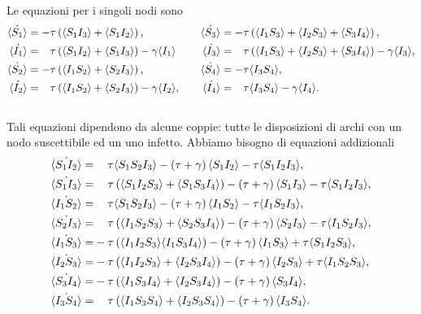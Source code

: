 \documentclass{report}
\begin{document}
Le equazioni per i singoli nodi sono 
 \begin{equation*}
 \begin{aligned}
 \dot{\angol{S_1}}&= -\tau \tonde{ \angol{ S_1 I_3} + \angol{S_1 I_2}},  \quad 
 &\dot{\angol{S_3}}&= -\tau \tonde{ \angol{I_1 S_3} + \angol{I_2 S_3}+ \angol{S_3 I_4}},  \\
 \dot{\angol{I_1}}&= \spa \tau \tonde{ \angol{ S_1 I_2} + \angol{S_1 I_3}} - \gamma\angol{I_1} \quad 
 &\dot{\angol{I_3}}&= \spa \tau \tonde{ \angol{I_1 S_3} + \angol{I_2 S_3}+ \angol{S_3 I_4}}-\gamma\angol{I_3},\\
 \dot{\angol{S_2}}&= -\tau \tonde{ \angol{ I_1 S_2} + \angol{S_2 I_3}}, \quad &\dot{\angol{S_4}} &= -\tau \angol{I_3S_4},  \\
 \dot{\angol{I_2}}&= \spa \tau \tonde{ \angol{ I_1 S_2} + \angol{S_2 I_3}} - \gamma\angol{I_2},\quad & \dot{\angol{I_4}}&=\spa \tau\angol{I_3S_4}-\gamma\angol{I_4}. \\\
 \end{aligned}	
 \end{equation*}
 Tali equazioni dipendono da alcune coppie: tutte le disposizioni di archi con un nodo suscettibile ed un uno infetto. Abbiamo bisogno di equazioni addizionali
 \begin{equation*}
 \begin{aligned}
 \dot{\angol{S_1I_2}} =&\spa \tau\angol{S_1S_2I_3} - \tonde{ \tau + \gamma} \angol{S_1 I_2} -\tau\angol{S_1I_2I_3},\\
 \dot{\angol{S_1I_3}}=&\spa \tau\tonde{ \angol{S_1I_2S_3} + \angol{S_1S_3I_4}} - \tonde{ \tau +\gamma}\angol{S_1 I_3} -\tau \angol{ S_1 I_2 I_3},\\
 \dot{\angol{I_1S_2}} =&\spa\tau\angol{S_1S_2I_3} - \tonde{ \tau + \gamma} \angol{I_1 S_2} -\tau\angol{I_1S_2I_3},\\
\dot{\angol{S_2I_3}} =&\spa \tau\tonde{\angol{I_1S_2S_3} +{\angol{S_2S_3I_4}}} - \tonde{ \tau + \gamma} \angol{S_2 I_3} -\tau\angol{I_1S_2I_3},\\
 \dot{\angol{I_1S_3}} =&- \tau\tonde{\angol{I_1I_2S_3} \angol{I_1S_3I_4}} - \tonde{ \tau + \gamma} \angol{I_1 S_3} +\tau\angol{S_1I_2S_3},\\ 
\dot{\angol{I_2S_3}} =&- \tau\tonde{\angol{I_1I_2S_3} +\angol{I_2S_3I_4}} - \tonde{ \tau + \gamma} \angol{I_2 S_3} +\tau\angol{I_1S_2S_3},\\ 
 \dot{\angol{S_3I_4}} =&- \tau\tonde{\angol{I_1S_3I_4}+\angol{I_2S_3I_4}} - \tonde{ \tau + \gamma} \angol{S_3 I_4}, \\ 
    \dot{\angol{I_3S_4}} =& \spa \tau\tonde{\angol{I_1S_3S_4}+\angol{I_2S_3S_4}} - \tonde{ \tau + \gamma} \angol{I_3 S_4}.\\ 
\end{aligned}
 \end{equation*}
\end{document}
